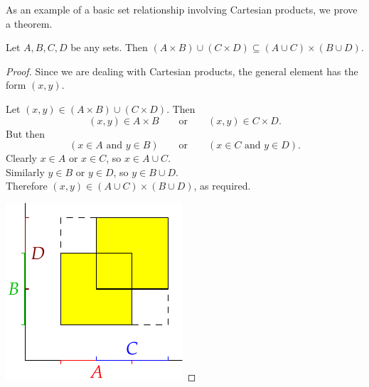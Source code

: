 As an example of a basic set relationship involving Cartesian products, we prove a theorem.

\begin{thm}\label{thm:cartex}
Let $A,B,C,D$ be any sets. Then $(A\times B)\cup(C\times D)\subseteq(A\cup C)\times(B\cup D)$.
\end{thm}

\begin{proof}
Since we are dealing with Cartesian products, the general element has the form $(x,y)$.\\
\noindent\begin{minipage}{0.65\textwidth}
Let $(x,y)\in(A\times B)\cup(C\times D)$. Then 
\[(x,y)\in A\times B\qquad \text{or}\qquad (x,y)\in C\times D.\]
But then
\[(x\in A\text{ and }y\in B)\qquad\text{or}\qquad(x\in C\text{ and }y\in D).\]
Clearly $x\in A$ or $x\in C$, so $x\in A\cup C$.\\
Similarly $y\in B$ or $y\in D$, so $y\in B\cup D$.\\
Therefore $(x,y)\in (A\cup C)\times(B\cup D)$, as required.
\end{minipage}
\qquad
\begin{minipage}{0.28\textwidth}
\centering
\includegraphics[width=\textwidth]{setsii-04-cartesian}
\end{minipage}
\end{proof}

